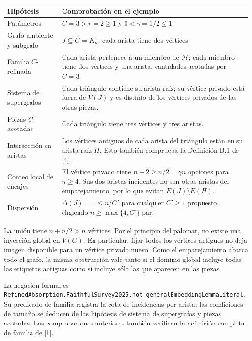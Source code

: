 \documentclass[spanish,11pt,a4paper]{article}
\begin{document}
{\begin{longtable}[]{@{}
  >{\raggedright\arraybackslash}p{}
  >{\raggedright\arraybackslash}p{}@{}}
\toprule\noalign{}
\begin{minipage}[b]{\linewidth}\raggedright
Hipótesis
\end{minipage} & \begin{minipage}[b]{\linewidth}\raggedright
Comprobación en el ejemplo
\end{minipage} \\
\midrule\noalign{}
\endhead
\bottomrule\noalign{}
\endlastfoot
Parámetros & \(C=3>r=2\ge1\) y \(0<\gamma=1/2\le1\). \\
Grafo ambiente y subgrafo & \(J\subseteq G=K_n\); cada arista tiene dos vértices. \\
Familia \(C\)-refinada & Cada arista pertenece a un miembro de \(\mathcal H\); cada miembro tiene dos vértices y una arista, cantidades acotadas por \(C=3\). \\
Sistema de supergrafos & Cada triángulo contiene su arista raíz; su vértice privado está fuera de \(V(J)\) y es distinto de los vértices privados de las otras piezas. \\
Piezas \(C\)-acotadas & Cada triángulo tiene tres vértices y tres aristas. \\
Intersección en aristas & Los vértices antiguos de cada arista del triángulo están en su arista raíz \(H\). Esto también comprueba la Definición B.1 de {[}4{]}. \\
Conteo local de encajes & El vértice privado tiene \(n-2\ge n/2=\gamma n\) opciones para \(n\ge4\). Sus dos aristas incidentes no son otras aristas del emparejamiento, por lo que evitan \(E(J)\setminus E(H)\). \\
Dispersión & \(\Delta(J)=1\le n/C'\) para cualquier \(C'\ge1\) propuesto, eligiendo \(n\ge\max\{4,C'\}\) par. \\
\end{longtable}
}

La unión tiene \(n+n/2>n\) vértices. Por el principio del palomar, no existe una inyección global en \(V(G)\). En particular, fijar todos los vértices antiguos no deja imagen disponible para un vértice privado nuevo. Como el emparejamiento abarca todo el grafo, la misma obstrucción vale tanto si el dominio global incluye todas las etiquetas antiguas como si incluye sólo las que aparecen en las piezas.

La negación formal es \texttt{Refined\allowbreak{}Absorption.\allowbreak{}Faithful\allowbreak{}Survey2025.\allowbreak{}not\_\allowbreak{}general\allowbreak{}Embedding\allowbreak{}Lemma\allowbreak{}Literal}. Su predicado de familia registra la cota de incidencias por arista; las condiciones de tamaño se deducen de las hipótesis de sistema de supergrafos y piezas acotadas. Las comprobaciones anteriores también verifican la definición completa de familia de {[}1{]}.
\end{document}
